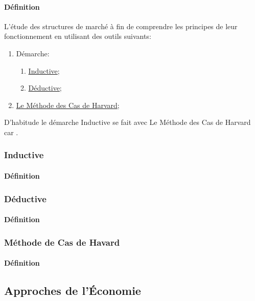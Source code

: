 \documentclass{article}
\begin{document}
\paragraph{Définition}L'étude des structures de marché à fin de comprendre les principes de leur fonctionnement en utilisant des outils suivants:
\begin{enumerate}
    \item Démarche:
    \begin{enumerate}[noitemsep]
        \item \href{https://fr.wikipedia.org/wiki/Induction_(logique)}{Inductive};

        \item \href{https://fr.wikipedia.org/wiki/M%C3%A9thode_hypoth%C3%A9tico-d%C3%A9ductive}{Déductive};
    \end{enumerate}

    \item \href{https://fr.wikipedia.org/wiki/M%C3%A9thode_des_cas}{Le Méthode des Cas de Harvard};
\end{enumerate}
D'habitude le démarche Inductive se fait avec Le Méthode des Cas de Harvard car .\\

\subsubsection{Inductive}
\paragraph{Définition}

\subsubsection{Déductive}
\paragraph{Définition}

\subsubsection{Méthode de Cas de Havard}
\paragraph{Définition}


\subsection{Approches de l'Économie}
\end{document}
